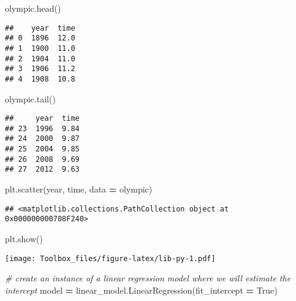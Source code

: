 \documentclass[
]{book}
\newenvironment{Shaded}{\begin{snugshade}}{\end{snugshade}}
\newcommand{\CommentTok}[1]{\textcolor[rgb]{0.56,0.35,0.01}{\textit{#1}}}
\newcommand{\NormalTok}[1]{#1}
\newcommand{\OperatorTok}[1]{\textcolor[rgb]{0.81,0.36,0.00}{\textbf{#1}}}
\newcommand{\StringTok}[1]{\textcolor[rgb]{0.31,0.60,0.02}{#1}}
\newcommand{\VariableTok}[1]{\textcolor[rgb]{0.00,0.00,0.00}{#1}}
\begin{document}
\begin{Shaded}
\begin{Highlighting}[]
\NormalTok{olympic.head()}
\end{Highlighting}
\end{Shaded}

\begin{verbatim}
##    year  time
## 0  1896  12.0
## 1  1900  11.0
## 2  1904  11.0
## 3  1906  11.2
## 4  1908  10.8
\end{verbatim}

\begin{Shaded}
\begin{Highlighting}[]
\NormalTok{olympic.tail()}
\end{Highlighting}
\end{Shaded}

\begin{verbatim}
##     year  time
## 23  1996  9.84
## 24  2000  9.87
## 25  2004  9.85
## 26  2008  9.69
## 27  2012  9.63
\end{verbatim}

\begin{Shaded}
\begin{Highlighting}[]
\NormalTok{plt.scatter(}\StringTok{\textquotesingle{}year\textquotesingle{}}\NormalTok{, }\StringTok{\textquotesingle{}time\textquotesingle{}}\NormalTok{, data }\OperatorTok{=}\NormalTok{ olympic)}
\end{Highlighting}
\end{Shaded}

\begin{verbatim}
## <matplotlib.collections.PathCollection object at 0x000000000708F240>
\end{verbatim}

\begin{Shaded}
\begin{Highlighting}[]
\NormalTok{plt.show()}
\end{Highlighting}
\end{Shaded}

\texttt{[image: Toolbox\_files/figure-latex/lib-py-1.pdf]}

\begin{Shaded}
\begin{Highlighting}[]
\CommentTok{\# create an instance of a linear regression model where we will estimate the intercept}
\NormalTok{model }\OperatorTok{=}\NormalTok{ linear\_model.LinearRegression(fit\_intercept }\OperatorTok{=} \VariableTok{True}\NormalTok{)}
\end{Highlighting}
\end{Shaded}
\end{document}
